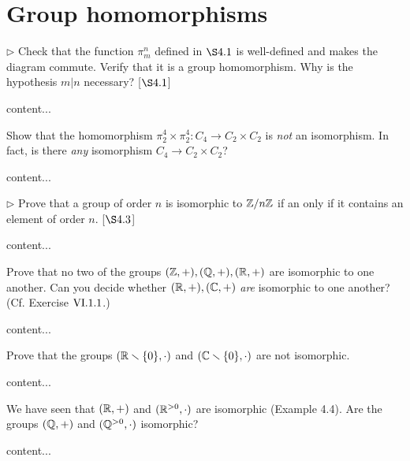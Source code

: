 \section{Group homomorphisms}
\extitle
\begin{exercise}
	$\triangleright$ Check that the function $\pi^n_m$ defined in $\S 4.1$ is well-defined and makes the diagram commute. Verify that it is a group homomorphism. Why is the hypothesis $m|n$ necessary? [$\S 4.1$]
\end{exercise}
\begin{solution}
	content...
\end{solution}

\begin{exercise}
	Show that the homomorphism $\pi_2^4 \times \pi_2^4\colon C_4 \to C_2 \times C_2$ is \emph{not} an isomorphism. In fact, is there \emph{any} isomorphism $C_4\to C_2\times C_2$?
\end{exercise}
\begin{solution}
	content...
\end{solution}

\begin{exercise}
	$\triangleright$ Prove that a group of order $n$ is isomorphic to $\mathbb{Z}/n\mathbb{Z}$ if an only if it contains an element of order $n$. [$\S 4.3$]
\end{exercise}
\begin{solution}
	content...
\end{solution}

\begin{exercise}
	Prove that no two of the groups $(\mathbb{Z}, +), (\mathbb{Q}, +), (\mathbb{R},+)$ are isomorphic to one another. Can you decide whether $(\mathbb{R},+),(\mathbb{C},+)$ \emph{are} isomorphic to one another? (Cf. Exercise $\RNo{6}.1.1$.)
\end{exercise}
\begin{solution}
	content...
\end{solution}

\begin{exercise}
	Prove that the groups $(\mathbb{R}\smallsetminus\{0\},\cdot)$ and $(\mathbb{C}\smallsetminus\{0\}, \cdot)$ are not isomorphic.
\end{exercise}
\begin{solution}
	content...
\end{solution}

\begin{exercise}
	We have seen that $(\mathbb{R},+)$ and $(\mathbb{R}^{>0}, \cdot)$ are isomorphic (Example 4.4). Are the groups $(\mathbb{Q},+)$ and $(\mathbb{Q}^{>0}, \cdot)$ isomorphic?
\end{exercise}
\begin{solution}
	content...
\end{solution}

